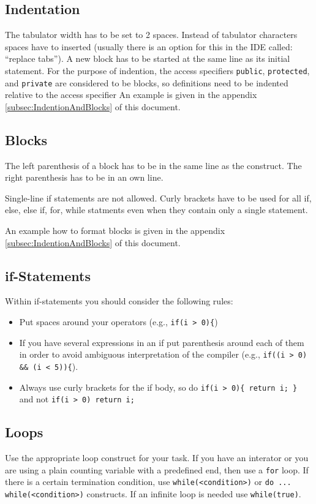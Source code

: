 \documentclass[final,a4paper,10pt, oneside]{article}
\begin{document}
\subsection{Indentation}
The tabulator width has to be set to 2 spaces.
Instead of tabulator characters spaces have to inserted (usually there is an option for this in the IDE called: ``replace tabs'').
A new block has to be started at the same line as its initial statement.
For the purpose of indention, the access specifiers \verb|public|, \verb|protected|, and \verb|private| are considered to be blocks, so definitions need to be indented relative to the access specifier
An example is given in the appendix \ref{subsec:IndentionAndBlocks} of this document.

\subsection{Blocks}
The left parenthesis of a block has to be in the same line as the construct. 
The right parenthesis has to be in an own line. 

Single-line if statements are not allowed. 
Curly brackets have to be used for all if, else, else if, for, while statments even when they contain only a single statement.

An example how to format blocks is given in the appendix \ref{subsec:IndentionAndBlocks} of this document.

\subsection{if-Statements}
Within if-statements you should consider the following rules:
\begin{itemize}
\item Put spaces around your operators (e.g., \verb|if(i > 0){|)
\item If you have several expressions in an if put parenthesis around each of them in order to avoid 
      ambiguous interpretation of the compiler (e.g., \verb|if((i > 0) && (i < 5)){|).
\item Always use curly brackets for the if body, so do \verb|if(i > 0){ return i; }| and not \verb|if(i > 0) return i;|

\end{itemize}

\subsection{Loops}
Use the appropriate loop construct for your task.
If you have an interator or you are using a plain counting variable with a predefined end, then use a \verb|for| loop.
If there is a certain termination condition, use \verb|while(<condition>)| or \verb|do ... while(<condition>)| constructs.
If an infinite loop is needed use \verb|while(true)|.
\end{document}
